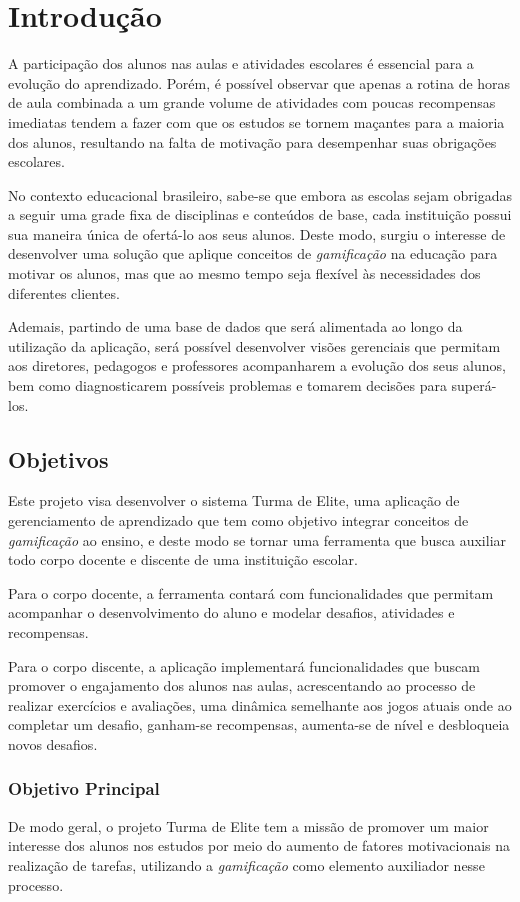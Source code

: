 \chapter[Introdução]{Introdução}
A participação dos alunos nas aulas e atividades escolares é essencial para a evolução do aprendizado. Porém, é possível observar que apenas a rotina de horas de aula combinada a um grande volume de atividades com poucas recompensas imediatas tendem a fazer com que os estudos se tornem maçantes para a maioria dos alunos, resultando na falta de motivação para desempenhar suas obrigações escolares.


No contexto educacional brasileiro, sabe-se que embora as escolas sejam obrigadas a seguir uma grade fixa de disciplinas e conteúdos de base, cada instituição possui sua maneira única de ofertá-lo aos seus alunos. Deste modo, surgiu o interesse de desenvolver uma solução que aplique conceitos de \textit{gamificação} na educação para motivar os alunos, mas que ao mesmo tempo seja flexível às necessidades dos diferentes clientes. 


Ademais, partindo de uma base de dados que será alimentada ao longo da utilização da aplicação, será possível desenvolver visões gerenciais que permitam aos diretores, pedagogos e professores acompanharem a evolução dos seus alunos, bem como diagnosticarem possíveis problemas e tomarem decisões para superá-los.

\section{Objetivos}
Este projeto visa desenvolver o sistema Turma de Elite, uma aplicação de gerenciamento de aprendizado que tem como objetivo integrar conceitos de \textit{gamificação} ao ensino, e deste modo se tornar uma ferramenta que busca auxiliar todo corpo docente e discente de uma instituição escolar.


Para o corpo docente, a ferramenta contará com funcionalidades que permitam acompanhar o desenvolvimento do aluno e modelar desafios, atividades e recompensas.


Para o corpo discente, a aplicação implementará funcionalidades que buscam promover o engajamento dos alunos nas aulas, acrescentando ao processo de realizar exercícios e avaliações, uma dinâmica semelhante aos jogos atuais onde ao completar um desafio, ganham-se recompensas, aumenta-se de nível e desbloqueia novos desafios.

\subsection{Objetivo Principal}
De modo geral, o projeto Turma de Elite tem a missão de promover um maior interesse dos alunos nos estudos por meio do aumento de fatores motivacionais na realização de tarefas, utilizando a \textit{gamificação} como elemento auxiliador nesse processo.

